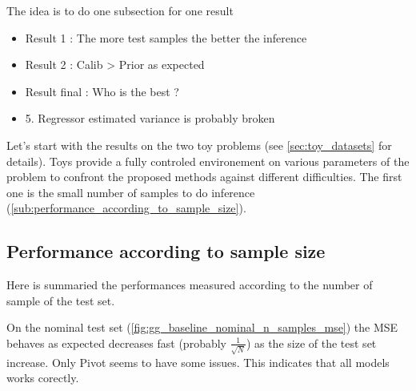 The idea is to do one subsection for one result
\begin{itemize}
  \item Result 1 : The more test samples the better the inference
  \item Result 2 : Calib > Prior as expected
  \item Result final : Who is the best ?
  \item 5. Regressor estimated variance is probably broken
\end{itemize}


Let's start with the results on the two toy problems (see \autoref{sec:toy_datasets} for details).
Toys provide a fully controled environement on various parameters of the problem to confront the proposed methods against different difficulties.
The first one is the small number of samples to do inference (\autoref{sub:performance_according_to_sample_size}).










\subsection{Performance according to sample size} %
\label{sub:performance_according_to_sample_size}

Here is summaried the performances measured according to the number of sample of the test set.

On the nominal test set (\autoref{fig:gg_baseline_nominal_n_samples_mse}) the MSE behaves as expected \ie decreases fast (probably $\frac{1}{\sqrt{N}}$) as the size of the test set increase.
Only Pivot seems to have some issues.
This indicates that all models works corectly.

